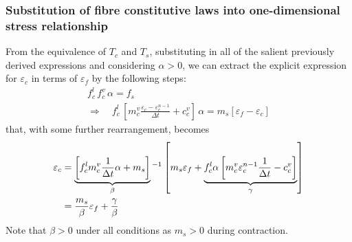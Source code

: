 \documentclass[]{scrartcl}
\begin{document}
\subsubsection*{Substitution of fibre constitutive laws into one-dimensional stress relationship}
From the equivalence of $T_{c}$ and $T_{s}$, substituting in all of the salient previously derived expressions and considering $\alpha > 0$, we can extract the explicit expression for $\varepsilon_{c}$ in terms of $\varepsilon_{f}$ by the following steps:
\begin{gather*}
f_{c}^{l} \, f_{c}^{v}  \, \alpha = f_{s} \\
\Rightarrow \quad f_{c}^{l} \, \left[ m_{c}^{v} \frac{\varepsilon_{c} - \varepsilon_{c}^{n-1}}{\Delta t} + c_{c}^{v} \right]  \, \alpha =  m_{s} \left[ \varepsilon_{f} - \varepsilon_{c} \right]
\end{gather*}
that, with some further rearrangement, becomes
\begin{align}
\varepsilon_{c}
  &= \underbrace{\left[ f_{c}^{l} m_{c}^{v} \frac{1}{\Delta t} \alpha + m_{s} \right]}_{\beta}\phantom{}^{-1} \left[ m_{s} \varepsilon_{f}  + \underbrace{f_{c}^{l} \alpha \left[ m_{c}^{v} \varepsilon_{c}^{n-1} \frac{1}{\Delta t} - c_{c}^{v} \right]}_{\gamma}\right] \notag\\
  &=  \frac{m_{s}}{\beta} \varepsilon_{f} + \frac{\gamma}{\beta}
\end{align}
Note that $\beta > 0$ under all conditions as $m_{s} > 0$ during contraction.
\end{document}
